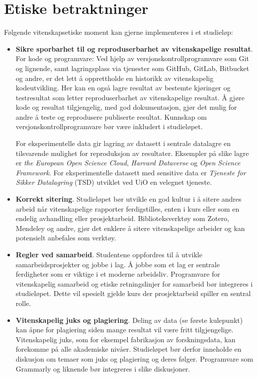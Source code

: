 \documentclass{article}
\begin{document}
\section{Etiske betraktninger}
Følgende vitenskapsetiske moment kan gjerne implementeres i et studieløp:

\begin{itemize}
  \item \textbf{Sikre sporbarhet til og reproduserbarhet av vitenskapelige resultat}. For kode og programvare: Ved hjelp av versjonskontrollprogramvare som Git og lignende, samt lagringsplass via tjenester som GitHub, GitLab, Bitbucket og andre, er det lett å opprettholde en historikk av vitenskapelig kodeutvikling. Her kan en også lagre resultat av bestemte kjøringer og testresultat som letter reproduserbarhet av vitenskapelige resultat. Å gjøre kode og resultat tilgjengelig, med god dokumentasjon, gjør det mulig for andre å teste og reprodusere publiserte resultat. Kunnskap om versjonskontrollprogramvare bør være inkludert i studieløpet.

    For eksperimentelle data gir lagring av datasett i sentrale datalagre en tilsvarende mulighet for reproduksjon av resultater. Eksempler på slike lagre er \emph{the European Open Science Cloud}, \emph{Harvard Dataverse} og \emph{Open Science Framework}. For eksperimentelle datasett med sensitive data er \emph{Tjeneste for Sikker Datalagring} (TSD) utviklet ved UiO en velegnet tjeneste.
  \item \textbf{Korrekt sitering}. Studieløpet bør utvikle en god kultur i å sitere andres arbeid når vitenskapelige rapporter ferdigstilles, enten i kurs eller som en endelig avhandling eller prosjektarbeid. Biblioteksverktøy som Zotero, Mendeley og andre, gjør det enklere å sitere vitenskapelige arbeider og kan potensielt anbefales som verktøy.
  \item \textbf{Regler ved samarbeid}. Studentene oppfordres til å utvikle samarbeidsprosjekter og jobbe i lag. Å jobbe som et lag er sentrale ferdigheter som er viktige i et moderne arbeidsliv. Programvare for vitenskapelig samarbeid og etiske retningslinjer for samarbeid bør integreres i studieløpet. Dette vil spesielt gjelde kurs der prosjektarbeid spiller en sentral rolle.
  \item \textbf{Vitenskapelig juks og plagiering}. Deling av data (se første kulepunkt) kan åpne for plagiering siden mange resultat vil være fritt tilgjengelige. Vitenskapelig juks, som for eksempel fabrikasjon av forskningsdata, kan forekomme på alle akademiske nivåer. Studieløpet bør derfor inneholde en diskusjon om temaer som juks og plagiering og deres følger. Programvare som Grammarly og liknende bør integreres i slike diskusjoner.
\end{itemize}
\end{document}
